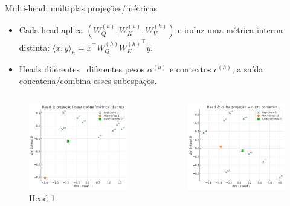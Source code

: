\documentclass{beamer}
\begin{document}
\begin{frame}{Multi-head: múltiplas projeções/métricas}
\begin{itemize}
  \item Cada head aplica $(W_Q^{(h)},W_K^{(h)},W_V^{(h)})$ e induz 
        uma métrica interna distinta: 
        $\langle x,y\rangle_h = x^\top W_Q^{(h)} {W_K^{(h)}}^\top y$.
  \item Heads diferentes \textrightarrow\ diferentes pesos $\alpha^{(h)}$ e 
        contextos $c^{(h)}$; a saída concatena/combina esses subespaços.
\end{itemize}
\begin{columns}[c]
  \begin{figure}
	\centering
	\includegraphics[width=\linewidth,height=0.55\textheight]{assets/att_head1.png}
	\caption{Head 1}
  \end{figure}
  \begin{figure}
	\centering
	\includegraphics[width=\linewidth,height=0.55\textheight]{assets/att_head2.png}

\end{figure}
\end{columns}
\end{frame}
\end{document}
